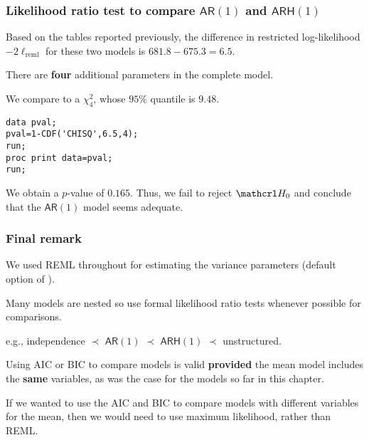 \documentclass{beamer}
\begin{document}
\begin{frame}[fragile]
\frametitle{Likelihood ratio test to compare $\mathsf{AR}(1)$ and $\mathsf{ARH}(1)$}
\bi
\item Based on the tables reported previously, the difference in restricted log-likelihood $-2\ell_{\textrm{reml}}$ for these two models is  $681.8-675.3=6.5$.
\item There are \textbf{four} additional parameters in the complete model. 

We compare to a $\chi^2_4$, whose $95$\% quantile is $9.48$.

\begin{tcolorbox}[colback=white,colframe=hecblue,title=\SASlang{} code to compute $p$-value using the $\chi^2_4$ null distribution]
\begin{verbatim}
data pval;
pval=1-CDF('CHISQ',6.5,4);
run;
proc print data=pval;
run;
\end{verbatim}
\end{tcolorbox}
\item We obtain a $p$-value of $0.165$. Thus, we fail to reject $\Hy_0$ and conclude that the $\mathsf{AR}(1)$ model seems adequate.
\ei
\end{frame}

\begin{frame}
\frametitle{Final remark}
\bi
\item We used REML throughout for estimating the variance parameters (default option of ). 
\item Many models are nested so use formal likelihood ratio tests whenever possible for comparisons.
\bi \item e.g., independence $\prec$ $\mathsf{AR}(1)$ $\prec$ $\mathsf{ARH}(1)$ $\prec$ unstructured.
\ei
\item Using AIC or BIC to compare models is valid \textbf{provided} the mean model includes the \textbf{same} variables, as was the case for the models so far in this chapter.
\item If we wanted to use the AIC and BIC to compare models with different variables for the mean, then we would need to use maximum likelihood, rather than REML.
\ei
\end{frame}
\end{document}
